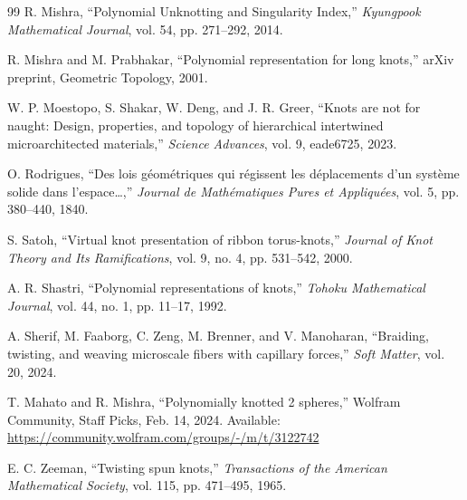 \documentclass[10pt,a4paper,reqno]{amsart}
\theoremstyle{definition}
\theoremstyle{remark}
\begin{document}
\begin{thebibliography}{99}
	R. Mishra,
	``Polynomial Unknotting and Singularity Index,''
	\emph{Kyungpook Mathematical Journal},
	vol. 54, pp. 271--292, 2014.
	
	R. Mishra and M. Prabhakar,
	``Polynomial representation for long knots,''
	arXiv preprint, Geometric Topology, 2001.
	
	W. P. Moestopo, S. Shakar, W. Deng, and J. R. Greer,
	``Knots are not for naught: Design, properties, and topology of hierarchical intertwined microarchitected materials,''
	\emph{Science Advances},
	vol. 9, eade6725, 2023.
	
	O. Rodrigues,
	``Des lois géométriques qui régissent les déplacements d'un système solide dans l'espace…,''
	\emph{Journal de Mathématiques Pures et Appliquées},
	vol. 5, pp. 380--440, 1840.
	
	S. Satoh,
	``Virtual knot presentation of ribbon torus-knots,''
	\emph{Journal of Knot Theory and Its Ramifications},
	vol. 9, no. 4, pp. 531--542, 2000.
	
	A. R. Shastri,
	``Polynomial representations of knots,''
	\emph{Tohoku Mathematical Journal},
	vol. 44, no. 1, pp. 11--17, 1992.
	
	A. Sherif, M. Faaborg, C. Zeng, M. Brenner, and V. Manoharan,
	``Braiding, twisting, and weaving microscale fibers with capillary forces,''
	\emph{Soft Matter},
	vol. 20, 2024.
	
	T. Mahato and R. Mishra,
	``Polynomially knotted 2 spheres,''
	Wolfram Community, Staff Picks, Feb. 14, 2024.
	Available: \url{https://community.wolfram.com/groups/-/m/t/3122742}
	
	E. C. Zeeman,
	``Twisting spun knots,''
	\emph{Transactions of the American Mathematical Society},
	vol. 115, pp. 471--495, 1965.
\end{thebibliography}
\end{document}

